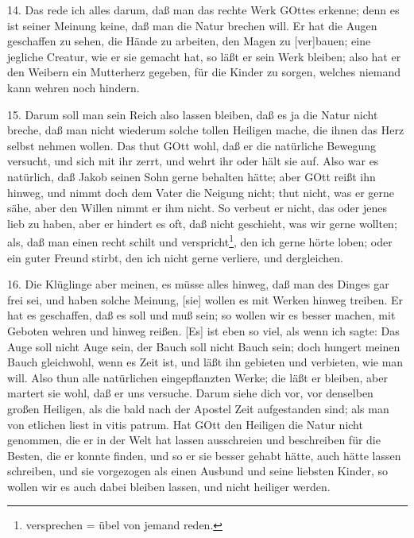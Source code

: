 14. Das rede ich alles darum, daß man das rechte Werk GOttes erkenne; denn es ist seiner Meinung keine, daß man die Natur brechen will. Er hat die Augen geschaffen zu sehen, die Hände zu arbeiten, den Magen zu [ver]bauen; eine jegliche Creatur, wie er sie gemacht hat, so läßt er sein Werk bleiben; also hat er den Weibern ein Mutterherz gegeben, für die Kinder zu sorgen, welches niemand kann wehren noch hindern.

15. Darum soll man sein Reich also lassen bleiben, daß es ja die Natur nicht breche, daß man nicht wiederum solche tollen Heiligen mache, die ihnen das Herz selbst nehmen wollen. Das thut GOtt wohl, daß er die natürliche Bewegung versucht, und sich mit ihr zerrt, und wehrt ihr oder hält sie auf. Also war es natürlich, daß Jakob seinen Sohn gerne behalten hätte; aber GOtt reißt ihn hinweg, und nimmt doch dem Vater die Neigung nicht; thut nicht, was er gerne sähe, aber den Willen nimmt er ihm nicht. So verbeut er nicht, das oder jenes lieb zu haben, aber er hindert es oft, daß nicht geschieht, was wir gerne wollten; als, daß man einen recht schilt und verspricht\footnote{versprechen = übel von jemand reden.}, den ich gerne hörte loben; oder ein guter Freund stirbt, den ich nicht gerne verliere, und dergleichen.

16. Die Klüglinge aber meinen, es müsse alles hinweg, daß man des Dinges gar frei sei, und haben solche Meinung, [sie] wollen es mit Werken hinweg treiben. Er hat es geschaffen, daß es soll und muß sein; so wollen wir es besser machen, mit Geboten wehren und hinweg reißen. [Es] ist eben so viel, als wenn ich sagte: Das Auge soll nicht Auge sein, der Bauch soll nicht Bauch sein; doch hungert meinen Bauch gleichwohl, wenn es Zeit ist, und läßt ihn gebieten und verbieten, wie man will. Also thun alle natürlichen eingepflanzten Werke; die läßt er bleiben, aber martert sie wohl, daß er uns versuche. Darum siehe dich vor, vor denselben großen Heiligen, als die bald nach der Apostel Zeit aufgestanden sind; als man von etlichen liest in vitis patrum. Hat GOtt den Heiligen die Natur nicht genommen, die er in der Welt hat lassen ausschreien und beschreiben für die Besten, die er konnte finden, und so er sie besser gehabt hätte, auch hätte lassen schreiben, und sie vorgezogen als einen Ausbund und seine liebsten Kinder, so wollen wir es auch dabei bleiben lassen, und nicht heiliger werden.

